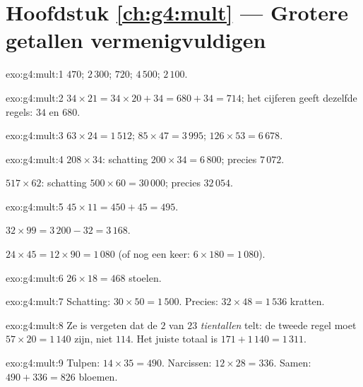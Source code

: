 \section*{Hoofdstuk \ref{ch:g4:mult} --- Grotere getallen vermenigvuldigen}

\begin{solution}{exo:g4:mult:1}
$470$; \quad $2\,300$; \quad $720$; \quad $4\,500$; \quad
$2\,100$.
\end{solution}

\begin{solution}{exo:g4:mult:2}
$34 \times 21 = 34 \times 20 + 34 = 680 + 34 = 714$; het cijferen geeft
dezelfde regels: $34$ en $680$.
\end{solution}

\begin{solution}{exo:g4:mult:3}
$63 \times 24 = 1\,512$; \quad
$85 \times 47 = 3\,995$; \quad
$126 \times 53 = 6\,678$.
\end{solution}

\begin{solution}{exo:g4:mult:4}
$208 \times 34$: schatting $200 \times 34 = 6\,800$; precies $7\,072$.

$517 \times 62$: schatting $500 \times 60 = 30\,000$; precies
$32\,054$.
\end{solution}

\begin{solution}{exo:g4:mult:5}
$45 \times 11 = 450 + 45 = 495$.

$32 \times 99 = 3\,200 - 32 = 3\,168$.

$24 \times 45 = 12 \times 90 = 1\,080$ (of nog een keer:
$6 \times 180 = 1\,080$).
\end{solution}

\begin{solution}{exo:g4:mult:6}
$26 \times 18 = 468$ stoelen.
\end{solution}

\begin{solution}{exo:g4:mult:7}
Schatting: $30 \times 50 = 1\,500$. Precies: $32 \times 48 = 1\,536$
kratten.
\end{solution}

\begin{solution}{exo:g4:mult:8}
Ze is vergeten dat de $2$ van $23$ \emph{tientallen} telt: de tweede regel
moet $57 \times 20 = 1\,140$ zijn, niet $114$. Het juiste totaal is
$171 + 1\,140 = 1\,311$.
\end{solution}

\begin{solution}{exo:g4:mult:9}
Tulpen: $14 \times 35 = 490$. Narcissen: $12 \times 28 = 336$. Samen:
$490 + 336 = 826$ bloemen.
\end{solution}

